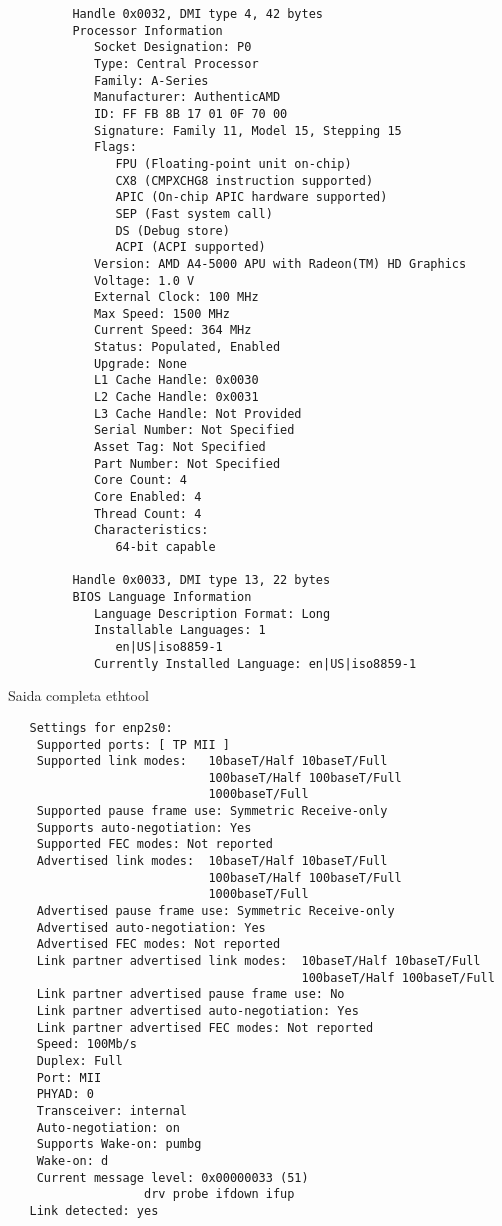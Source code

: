 \documentclass[11pt]{article}
\begin{document}
\begin{tiny}
\begin{verbatim}
         Handle 0x0032, DMI type 4, 42 bytes
         Processor Information
            Socket Designation: P0
            Type: Central Processor
            Family: A-Series
            Manufacturer: AuthenticAMD
            ID: FF FB 8B 17 01 0F 70 00
            Signature: Family 11, Model 15, Stepping 15
            Flags:
               FPU (Floating-point unit on-chip)
               CX8 (CMPXCHG8 instruction supported)
               APIC (On-chip APIC hardware supported)
               SEP (Fast system call)
               DS (Debug store)
               ACPI (ACPI supported)
            Version: AMD A4-5000 APU with Radeon(TM) HD Graphics    
            Voltage: 1.0 V
            External Clock: 100 MHz
            Max Speed: 1500 MHz
            Current Speed: 364 MHz
            Status: Populated, Enabled
            Upgrade: None
            L1 Cache Handle: 0x0030
            L2 Cache Handle: 0x0031
            L3 Cache Handle: Not Provided
            Serial Number: Not Specified
            Asset Tag: Not Specified
            Part Number: Not Specified
            Core Count: 4
            Core Enabled: 4
            Thread Count: 4
            Characteristics:
               64-bit capable
         
         Handle 0x0033, DMI type 13, 22 bytes
         BIOS Language Information
            Language Description Format: Long
            Installable Languages: 1
               en|US|iso8859-1
            Currently Installed Language: en|US|iso8859-1      
         \end{verbatim}
      \end{tiny}

      \newpage
      Saida completa ethtool\\
      \begin{tiny}
         \begin{verbatim}
   Settings for enp2s0:
	Supported ports: [ TP MII ]
	Supported link modes:   10baseT/Half 10baseT/Full 
	                        100baseT/Half 100baseT/Full 
	                        1000baseT/Full 
	Supported pause frame use: Symmetric Receive-only
	Supports auto-negotiation: Yes
	Supported FEC modes: Not reported
	Advertised link modes:  10baseT/Half 10baseT/Full 
	                        100baseT/Half 100baseT/Full 
	                        1000baseT/Full 
	Advertised pause frame use: Symmetric Receive-only
	Advertised auto-negotiation: Yes
	Advertised FEC modes: Not reported
	Link partner advertised link modes:  10baseT/Half 10baseT/Full 
	                                     100baseT/Half 100baseT/Full 
	Link partner advertised pause frame use: No
	Link partner advertised auto-negotiation: Yes
	Link partner advertised FEC modes: Not reported
	Speed: 100Mb/s
	Duplex: Full
	Port: MII
	PHYAD: 0
	Transceiver: internal
	Auto-negotiation: on
	Supports Wake-on: pumbg
	Wake-on: d
	Current message level: 0x00000033 (51)
			       drv probe ifdown ifup
   Link detected: yes
      \end{verbatim}
   \end{tiny}
\end{document}
